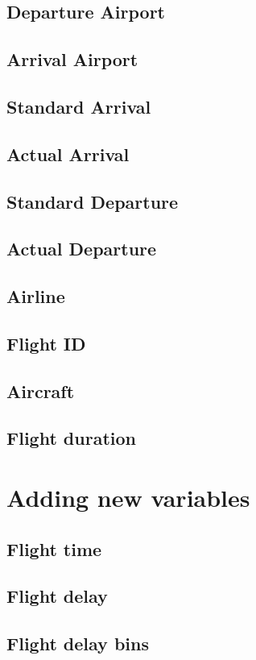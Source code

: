 \subsection{Departure Airport}
\subsection{Arrival Airport}
\subsection{Standard Arrival}
\subsection{Actual Arrival}
\subsection{Standard Departure}
\subsection{Actual Departure}
\subsection{Airline}
\subsection{Flight ID}
\subsection{Aircraft}
\subsection{Flight duration}

\section{Adding new variables}
\subsection{Flight time}
\subsection{Flight delay}
\subsection{Flight delay bins}
